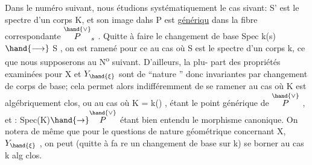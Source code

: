 Dans le numéro suivant, nous étudions systématiquement le cas
sivant: S' est le spectre d'un corps K, et son image dahs P est \uline{génériqu}
dans la fibre correspondante $\overset{\hand{\vee}}{P}_s$ . Quitte à faire le changement de base
Spec k(s) $\hand{\longrightarrow}$ S , on est ramené pour ce au cas où S est le spectre
d'un corps k, ce que nous supposerons au N\textsuperscript{o} suivant. D'ailleurs, la plu-%
part des propriétés examinées pour X et $Y_{\hand{\xi}}$ sont de ``nature ''
donc invariantes par changement de corps de base; cela permet alors
indifféremment de se ramener au cas où K est algébriquement clos, ou au
cas où K = k(\hand{$\eta$}) , \hand{$\eta$} étant le point générique de $\overset{\hand{\vee}}{P}$ , et \hand{$\xi$} : Spec(K)$\hand{\to}\overset{\hand{\vee}}{P}$
étant bien entendu le morphisme canonique. On notera de même que pour le
questions de nature géométrique concernant X, $Y_{\hand{\xi}}$ , on peut (quitte à fa
re un changement de base sur k) se borner au cas k alg clos.

